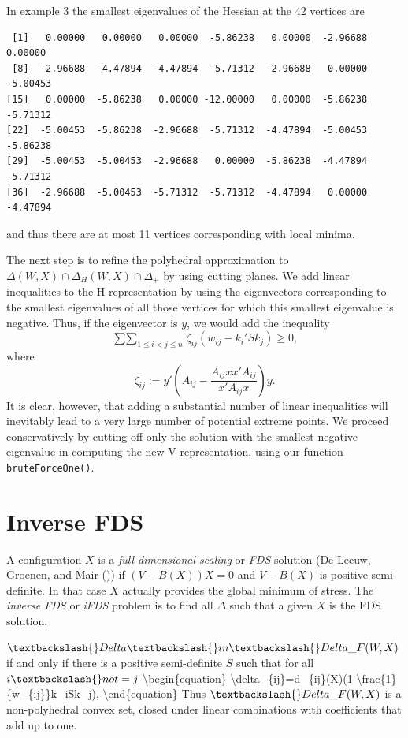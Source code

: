 \documentclass[
  12pt,
  letterpaper,
  DIV=11,
  numbers=noendperiod]{scrreprt}
\newenvironment{Shaded}{\begin{snugshade}}{\end{snugshade}}
\newcommand{\NormalTok}[1]{\textcolor[rgb]{0.00,0.23,0.31}{#1}}
\theoremstyle{remark}
\begin{document}
In example 3 the smallest eigenvalues of the Hessian at the 42 vertices
are

\begin{verbatim}
 [1]   0.00000   0.00000   0.00000  -5.86238   0.00000  -2.96688   0.00000
 [8]  -2.96688  -4.47894  -4.47894  -5.71312  -2.96688   0.00000  -5.00453
[15]   0.00000  -5.86238   0.00000 -12.00000   0.00000  -5.86238  -5.71312
[22]  -5.00453  -5.86238  -2.96688  -5.71312  -4.47894  -5.00453  -5.86238
[29]  -5.00453  -5.00453  -2.96688   0.00000  -5.86238  -4.47894  -5.71312
[36]  -2.96688  -5.00453  -5.71312  -5.71312  -4.47894   0.00000  -4.47894
\end{verbatim}

and thus there are at most 11 vertices corresponding with local minima.

The next step is to refine the polyhedral approximation to
\(\Delta(W,X)\cap\Delta_H(W,X)\cap\Delta_+\) by using cutting planes. We
add linear inequalities to the H-representation by using the
eigenvectors corresponding to the smallest eigenvalues of all those
vertices for which this smallest eigenvalue is negative. Thus, if the
eigenvector is \(y\), we would add the inequality \begin{equation}
\mathop{\sum\sum}_{1\leq i<j\leq n}\zeta_{ij}(w_{ij}-k_i'Sk_j)\geq 0,
\end{equation} where \[
\zeta_{ij}:=y'\left(A_{ij}-\frac{A_{ij}xx'A_{ij}}{x'A_{ij}x}\right)y.
\] It is clear, however, that adding a substantial number of linear
inequalities will inevitably lead to a very large number of potential
extreme points. We proceed conservatively by cutting off only the
solution with the smallest negative eigenvalue in computing the new V
representation, using our function \texttt{bruteForceOne()}.

\section{Inverse FDS}\label{inverse-fds}

A configuration \(X\) is a \emph{full dimensional scaling} or \emph{FDS}
solution (De Leeuw, Groenen, and Mair
()) if \((V-B(X))X=0\)
and \(V-B(X)\) is positive semi-definite. In that case \(X\) actually
provides the global minimum of stress. The \emph{inverse FDS} or
\emph{iFDS} problem is to find all \(\Delta\) such that a given \(X\) is
the FDS solution.

\begin{Shaded}
\begin{Highlighting}[]
\NormalTok{$\textbackslash{}Delta\textbackslash{}in\textbackslash{}Delta\_F(W,X)$ if and only if there is a positive semi{-}definite $S$ such that for all $i\textbackslash{}not= j$ }
\NormalTok{\textbackslash{}begin\{equation\}}
\NormalTok{\textbackslash{}delta\_\{ij\}=d\_\{ij\}(X)(1{-}\textbackslash{}frac\{1\}\{w\_\{ij\}\}k\_i\textquotesingle{}Sk\_j),}
\NormalTok{\textbackslash{}end\{equation\}}
\NormalTok{Thus $\textbackslash{}Delta\_F(W,X)$ is a non{-}polyhedral convex set, closed under linear combinations with coefficients that add up to one.}
\end{Highlighting}
\end{Shaded}
\end{document}
